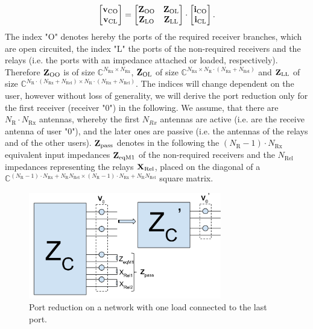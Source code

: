 \begin{align}
\label{eq:ocl_matrix}
\begin{bmatrix}
\mathbf{v}_\text{CO} \\
\mathbf{v}_\text{CL}
\end{bmatrix}
=
\begin{bmatrix}
\mathbf{Z}_\text{OO} & \mathbf{Z}_\text{OL}\\
\mathbf{Z}_\text{LO} & \mathbf{Z}_\text{LL}
\end{bmatrix}\cdot
\begin{bmatrix}
\mathbf{i}_\text{CO} \\
\mathbf{i}_\text{CL}
\end{bmatrix}.
\end{align}
The index "O" denotes hereby the ports of the required receiver branches, which are open circuited, the index "L" the ports of the non-required receivers and the relays (i.e. the ports with an impedance attached or loaded, respectively).
Therefore $\mathbf{Z}_\text{OO}$ is of size $\mathbb{C}^{N_\text{Rx}\times N_\text{Rx}}$,
	$\mathbf{Z}_\text{OL}$ of size $\mathbb{C}^{N_\text{Rx}\times N_\text{R}\cdot\left(N_\text{Rx}+N_\text{Rel}\right)}$ and
	$\mathbf{Z}_\text{LL}$ of size $\mathbb{C}^{ N_\text{R}\cdot\left(N_\text{Rx}+N_\text{Rel}\right)\times N_\text{R}\cdot\left(N_\text{Rx}+N_\text{Rel}\right)}$.
The indices will change dependent on the user, however without loss of generality, we will derive the port reduction only for the first receiver (receiver "0") in the following.
We assume, that there are $N_\text{R} \cdot N_\text{Rx}$ antennas, whereby the first $N_{Rx}$ antennas are active (i.e. are the receive antenna of user "0"), and the later ones are passive (i.e. the antennas of the relays and of the other users).
$\mathbf{Z}_{\text{pass}}$ denotes in the following the $(N_\text{R}-1)\cdot N_\text{Rx}$ equivalent input impedances $\mathbf{Z}_{\text{eqM1}}$ of the non-required receivers and the $N_\text{Rel}$ impedances representing the relays $\mathbf{X}_{\text{Rel}}$, placed on the diagonal of a $\mathbb{C}^
	{(N_\text{R}-1)\cdot N_\text{Rx}+N_\text{R}N_\text{Rel}
	\times (N_\text{R}-1)\cdot N_\text{Rx}+N_\text{R}N_\text{Rel}}$ square matrix.
\begin{figure}[h]
\begin{center}
\includegraphics[width=0.75\textwidth]{images/Port_reduction.png}
\caption{Port reduction on a network with one load connected to the last port.}
\label{fig:port_reduction}
\end{center}
\end{figure}

